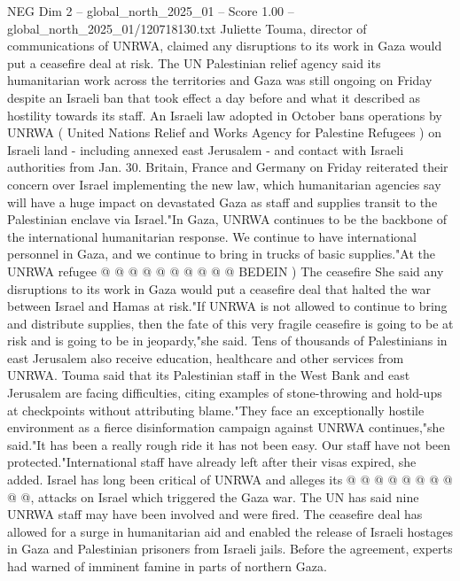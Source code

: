 \begin{textsample}{NEG Dim 2 – global\_north\_2025\_01 – Score 1.00 – global\_north\_2025\_01/120718130.txt}  \label{ex:f2_neg_050}
Juliette Touma, director of communications of UNRWA, claimed any disruptions to its work in Gaza would put a ceasefire deal at risk.
The UN Palestinian relief agency said its humanitarian work across the territories and Gaza was still ongoing on Friday despite an Israeli ban that took effect a day before and what it described as hostility towards its staff.
An Israeli law adopted in October bans operations by UNRWA ( United Nations Relief and Works Agency for Palestine Refugees ) on Israeli land - including annexed east Jerusalem - and contact with Israeli authorities from Jan. 30.
Britain, France and Germany on Friday reiterated their concern over Israel implementing the new law, which humanitarian agencies say will have a huge impact on devastated Gaza as staff and supplies transit to the Palestinian enclave via Israel."In Gaza, UNRWA continues to be the backbone of the international humanitarian response.
We continue to have international personnel in Gaza, and we continue to bring in trucks of basic supplies."At the UNRWA refugee @ @ @ @ @ @ @ @ @ @ BEDEIN ) The ceasefire She said any disruptions to its work in Gaza would put a ceasefire deal that halted the war between Israel and Hamas at risk."If UNRWA is not allowed to continue to bring and distribute supplies, then the fate of this very fragile ceasefire is going to be at risk and is going to be in jeopardy,"she said.
Tens of thousands of Palestinians in east Jerusalem also receive education, healthcare and other services from UNRWA.
Touma said that its Palestinian staff in the West Bank and east Jerusalem are facing difficulties, citing examples of stone-throwing and hold-ups at checkpoints without attributing blame."They face an exceptionally hostile environment as a fierce disinformation campaign against UNRWA continues,"she said."It has been a really rough ride it has not been easy.
Our staff have not been protected."International staff have already left after their visas expired, she added.
Israel has long been critical of UNRWA and alleges its @ @ @ @ @ @ @ @ @ @, attacks on Israel which triggered the Gaza war.
The UN has said nine UNRWA staff may have been involved and were fired.
The ceasefire deal has allowed for a surge in humanitarian aid and enabled the release of Israeli hostages in Gaza and Palestinian prisoners from Israeli jails.
Before the agreement, experts had warned of imminent famine in parts of northern Gaza.

\end{textsample}
